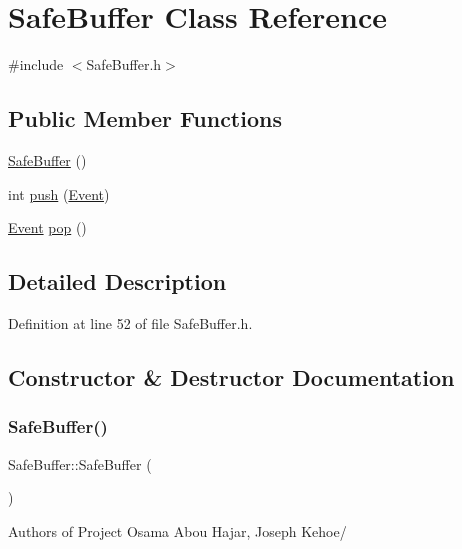 \hypertarget{class_safe_buffer}{}\section{Safe\+Buffer Class Reference}
\label{class_safe_buffer}


{\ttfamily \#include $<$Safe\+Buffer.\+h$>$}

\subsection*{Public Member Functions}
\begin{DoxyCompactItemize}
\item 
\hyperlink{class_safe_buffer_af835d8d08c4dcd3326f21ae2e9988699}{Safe\+Buffer} ()
\item 
int \hyperlink{class_safe_buffer_ac3ed0799ec2e84c97e36b22c83f7abf5}{push} (\hyperlink{class_event}{Event})
\item 
\hyperlink{class_event}{Event} \hyperlink{class_safe_buffer_a90a33fca4d838f7c0eef6e8557f3c281}{pop} ()
\end{DoxyCompactItemize}


\subsection{Detailed Description}


Definition at line 52 of file Safe\+Buffer.\+h.



\subsection{Constructor \& Destructor Documentation}
\mbox{\label{class_safe_buffer_af835d8d08c4dcd3326f21ae2e9988699}} 
\subsubsection{\texorpdfstring{Safe\+Buffer()}{SafeBuffer()}}
{\footnotesize\ttfamily Safe\+Buffer\+::\+Safe\+Buffer (\begin{DoxyParamCaption}{ }\end{DoxyParamCaption})}

Authors of Project Osama Abou Hajar, Joseph Kehoe/

